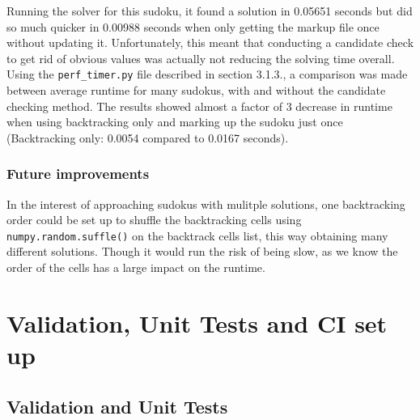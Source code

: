 \documentclass[12pt]{report} %
\begin{document}
Running the solver for this sudoku, it found a solution in 0.05651 seconds but did so much quicker in 0.00988 seconds when only getting the markup file once without updating it. Unfortunately, this meant that conducting a candidate check to get rid of obvious values was actually not reducing the solving time overall. Using the \texttt{perf\_timer.py} file described in section 3.1.3., a comparison was made between average runtime for many sudokus, with and without the candidate checking method. The results showed almost a factor of 3 decrease in runtime when using backtracking only and marking up the sudoku just once (Backtracking only: 0.0054 compared to 0.0167 seconds).

\subsection{Future improvements}

In the interest of approaching sudokus with mulitple solutions, one backtracking order could be set up to shuffle the backtracking cells using \texttt{numpy.random.suffle()} on the backtrack cells list, this way obtaining many different solutions. Though it would run the risk of being slow, as we know the order of the cells has a large impact on the runtime.

\chapter{Validation, Unit Tests and CI set up}

\section{Validation and Unit Tests}
\end{document}
